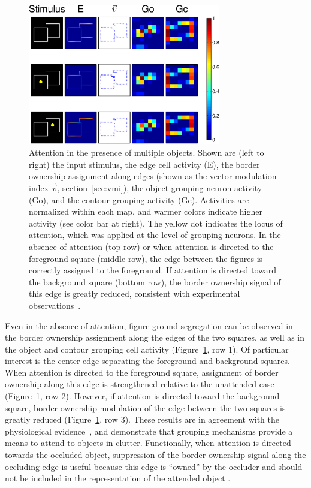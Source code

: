 \begin{figure}[t!]
\centering
\includegraphics[width=0.75\textwidth]{Contour/figs/Fig8.eps}
\makeatletter
\let\@currsize\normalsize
\caption[Attention modulates border-ownership responses in the presence of multiple objects]{Attention in the presence of multiple objects. Shown are (left to right) the input stimulus, the edge cell activity (E), the border ownership assignment along edges (shown as the vector modulation index $\vec{v}$, section~\ref{sec:vmi}), the object grouping neuron activity (Go), and the contour grouping activity (Gc). Activities are normalized within each map, and warmer colors indicate higher activity (see color bar at right). The yellow dot indicates the locus of attention, which was applied at the level of grouping neurons. In the absence of attention (top row) or when attention is directed to the foreground square (middle row), the edge between the figures is correctly assigned to the foreground. If attention is directed toward the background square (bottom row), the border ownership signal of this edge is greatly reduced, consistent with experimental observations~\citep{Qiu_etal07}.}
\label{Fig:Overlap_Square}
\end{figure}

Even in the absence of attention, figure-ground segregation can be
observed in the border ownership assignment along the edges of the two
squares, as well as in the object and contour grouping cell activity
(Figure~\ref{Fig:Overlap_Square}, row 1).  Of particular interest is
the center edge separating the foreground and background squares. When
attention is directed to the foreground square, assignment of border
ownership along this edge is strengthened relative to the unattended
case (Figure~\ref{Fig:Overlap_Square}, row 2).  However, if attention
is directed toward the background square, border ownership modulation
of the edge between the two squares is greatly reduced
(Figure~\ref{Fig:Overlap_Square}, row 3).  These results are in
agreement with the physiological evidence~\citep{Qiu_etal07}, and
demonstrate that grouping mechanisms provide a means to attend to
objects in clutter.
Functionally, when attention is directed towards the occluded object,
suppression of the border ownership signal along the occluding edge is
useful because this edge is ``owned'' by the occluder and should not
be included in the representation of the attended object
\citep{Craft_etal07}.

